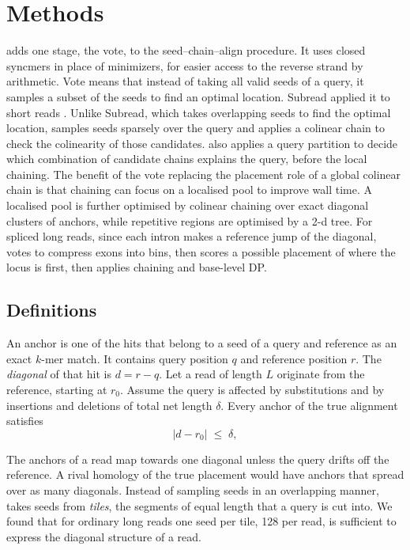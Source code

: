 \section{Methods}

\flash{} adds one stage, the vote, to the seed--chain--align procedure. It uses closed syncmers \citep{edgar2021syncmers} in place of minimizers, for easier access to the reverse strand by arithmetic. Vote means that instead of taking all valid seeds of a query, it samples a subset of the seeds to find an optimal location. Subread applied it to short reads \citep{liao2013subread}. Unlike Subread, which takes overlapping seeds to find the optimal location, \flash{} samples seeds sparsely over the query and applies a colinear chain to check the colinearity of those candidates. \flash{} also applies a query partition to decide which combination of candidate chains explains the query, before the local chaining. The benefit of the vote replacing the placement role of a global colinear chain is that chaining can focus on a localised pool to improve wall time. A localised pool is further optimised by colinear chaining over exact diagonal clusters of anchors, while repetitive regions are optimised by a 2-d tree. For spliced long reads, since each intron makes a reference jump of the diagonal, \flash{} votes to compress exons into bins, then scores a possible placement of where the locus is first, then applies chaining and base-level DP.

\subsection{Definitions}
\label{sec:defs}

An anchor is one of the hits that belong to a seed of a query and reference as an exact $k$-mer match. It contains query position $q$ and reference position $r$. The \emph{diagonal} of that hit is $d=r-q$. Let a read of length $L$ originate from the reference, starting at $r_0$. Assume the query is affected by substitutions and by insertions and deletions of total net length $\delta$. Every anchor of the true alignment satisfies
\begin{equation}
\lvert d - r_0 \rvert \;\le\; \delta,
\label{eq:band}
\end{equation}

The anchors of a read map towards one diagonal unless the query drifts off the reference. A rival homology of the true placement would have anchors that spread over as many diagonals. Instead of sampling seeds in an overlapping manner, \flash{} takes seeds from \emph{tiles}, the segments of equal length that a query is cut into. We found that for ordinary long reads one seed per tile, 128 per read, is sufficient to express the diagonal structure of a read.

